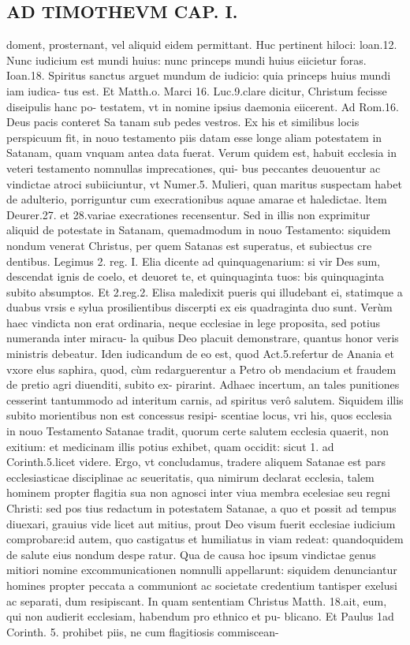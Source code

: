 \documentclass{article}
\begin{document}
\begin{pages}
\section*{AD TIMOTHEVM CAP. I. }
\marginpar{[ p.63 ]}\pstart doment, prosternant, vel aliquid eidem permittant. Huc pertinent hiloci: loan.12. Nunc iudicium est mundi huius: nunc princeps mundi huius eiicietur foras. Ioan.18. Spiritus sanctus arguet mundum de iudicio: quia princeps huius mundi iam iudica- tus est. Et Matth.o. Marci 16. Luc.9.clare dicitur, Christum fecisse diseipulis hanc po- testatem, vt in nomine ipsius daemonia eiicerent. Ad Rom.16. Deus pacis conteret Sa tanam sub pedes vestros. Ex his et similibus locis perspicuum fit, in nouo testamento piis datam esse longe aliam potestatem in Satanam, quam vnquam antea data fuerat. Verum quidem est, habuit ecclesia in veteri testamento nomnullas imprecationes, qui- bus peccantes deuouentur ac vindictae atroci subiiciuntur, vt Numer.5. Mulieri, quan maritus suspectam habet de adulterio, porriguntur cum execrationibus aquae amarae et haledictae. ltem Deurer.27. et 28.variae execrationes recensentur. Sed in illis non exprimitur aliquid de potestate in Satanam, quemadmodum in nouo Testamento: siquidem nondum venerat Christus, per quem Satanas est superatus, et subiectus cre dentibus. Legimus 2. reg. I. Elia dicente ad quinquagenarium: si vir Des sum, descendat ignis de coelo, et deuoret te, et quinquaginta tuos: bis quinquaginta subito absumptos. Et 2.reg.2. Elisa maledixit pueris qui illudebant ei, statimque  a duabus  vrsis e sylua prosilientibus  discerpti ex eis quadraginta duo sunt. Verùm haec vindicta non erat ordinaria, neque  ecclesiae in lege proposita, sed potius numeranda inter miracu- la quibus Deo placuit demonstrare, quantus honor veris ministris debeatur. Iden iudicandum de eo est, quod Act.5.refertur de Anania et vxore elus saphira, quod, cùm redarguerentur a Petro ob mendacium et fraudem de pretio agri diuenditi, subito ex- pirarint. Adhaec incertum, an tales punitiones cesserint tantummodo ad interitum carnis, ad spiritus verô salutem. Siquidem illis subito morientibus non est concessus resipi- scentiae locus, vri his, quos ecclesia in nouo Testamento Satanae tradit, quorum certe salutem ecclesia quaerit, non exitium: et medicinam illis potius exhibet, quam occidit: sicut 1. ad Corinth.5.licet videre. Ergo, vt concludamus, tradere aliquem Satanae est pars ecclesiasticae disciplinae ac seueritatis, qua nimirum declarat ecclesia, talem hominem propter flagitia sua non agnosci inter viua membra ecelesiae seu regni Christi: sed pos tius redactum in potestatem Satanae, a quo et possit ad tempus diuexari, grauius vide licet aut mitius, prout Deo visum fuerit ecclesiae iudicium comprobare:id autem, quo castigatus et humiliatus in viam redeat: quandoquidem de salute eius nondum despe ratur. Qua de causa hoc ipsum vindictae genus mitiori nomine excommunicationen nomnulli appellarunt: siquidem denunciantur homines propter peccata a communiont ac societate credentium tantisper exelusi ac separati, dum resipiscant. In quam sententiam Christus Matth. 18.ait, eum, qui non audierit ecclesiam, habendum pro ethnico et pu- blicano. Et Paulus 1ad Corinth. 5. prohibet piis, ne cum flagitiosis commiscean- 
\end{pages}
\end{document}
